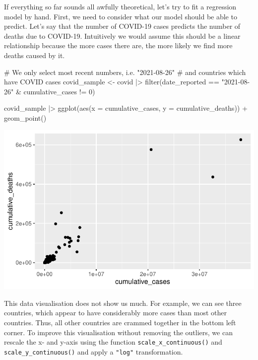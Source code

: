 \documentclass[
  letterpaper,
  DIV=11,
  numbers=noendperiod]{scrreprt}
\newenvironment{Shaded}{\begin{snugshade}}{\end{snugshade}}
\newcommand{\AttributeTok}[1]{\textcolor[rgb]{0.40,0.45,0.13}{#1}}
\newcommand{\CommentTok}[1]{\textcolor[rgb]{0.37,0.37,0.37}{#1}}
\newcommand{\DecValTok}[1]{\textcolor[rgb]{0.68,0.00,0.00}{#1}}
\newcommand{\FunctionTok}[1]{\textcolor[rgb]{0.28,0.35,0.67}{#1}}
\newcommand{\NormalTok}[1]{\textcolor[rgb]{0.00,0.23,0.31}{#1}}
\newcommand{\OtherTok}[1]{\textcolor[rgb]{0.00,0.23,0.31}{#1}}
\newcommand{\SpecialCharTok}[1]{\textcolor[rgb]{0.37,0.37,0.37}{#1}}
\newcommand{\StringTok}[1]{\textcolor[rgb]{0.13,0.47,0.30}{#1}}
\begin{document}
If everything so far sounds all awfully theoretical, let's try to fit a
regression model by hand. First, we need to consider what our model
should be able to predict. Let's say that the number of COVID-19 cases
predicts the number of deaths due to COVID-19. Intuitively we would
assume this should be a linear relationship because the more cases there
are, the more likely we find more deaths caused by it.

\begin{Shaded}
\begin{Highlighting}[]
\CommentTok{\# We only select most recent numbers, i.e. "2021{-}08{-}26"}
\CommentTok{\# and countries which have COVID cases}
\NormalTok{covid\_sample }\OtherTok{\textless{}{-}}
\NormalTok{  covid }\SpecialCharTok{|\textgreater{}}
  \FunctionTok{filter}\NormalTok{(date\_reported }\SpecialCharTok{==} \StringTok{"2021{-}08{-}26"} \SpecialCharTok{\&}
\NormalTok{         cumulative\_cases }\SpecialCharTok{!=} \DecValTok{0}\NormalTok{)}

\NormalTok{covid\_sample }\SpecialCharTok{|\textgreater{}}
  \FunctionTok{ggplot}\NormalTok{(}\FunctionTok{aes}\NormalTok{(}\AttributeTok{x =}\NormalTok{ cumulative\_cases,}
             \AttributeTok{y =}\NormalTok{ cumulative\_deaths)) }\SpecialCharTok{+}
  \FunctionTok{geom\_point}\NormalTok{()}
\end{Highlighting}
\end{Shaded}

\includegraphics{13_regressions_files/figure-latex/fitting-model-by-hand-step-one-1.pdf}

This data visualisation does not show us much. For example, we can see
three countries, which appear to have considerably more cases than most
other countries. Thus, all other countries are crammed together in the
bottom left corner. To improve this visualisation without removing the
outliers, we can rescale the x- and y-axis using the function
\texttt{scale\_x\_continuous()} and \texttt{scale\_y\_continuous()} and
apply a \texttt{"log"} transformation.
\end{document}
